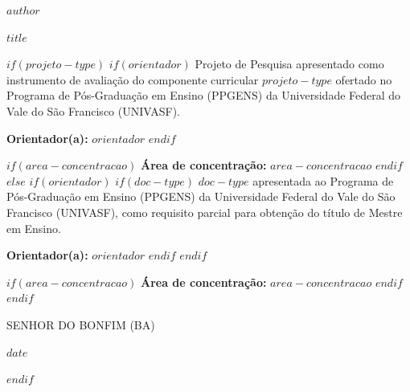 \begin{titlepage}
\thispagestyle{empty}
\begin{center}

{\Large\bfseries\MakeUppercase{$author$}}

\vspace{4cm}

{\Large\bfseries\MakeUppercase{$title$}}

\vspace{2cm}
\end{center}

\begin{flushright}
\begin{minipage}{0.5\textwidth}
$if(projeto-type)$
$if(orientador)$
Projeto de Pesquisa apresentado como instrumento de avaliação do componente curricular $projeto-type$ ofertado no Programa de Pós-Graduação em Ensino (PPGENS) da Universidade Federal do Vale do São Francisco (UNIVASF).

\vspace{1cm}

{\bfseries Orientador(a):} $orientador$
$endif$

\vspace{1cm}

$if(area-concentracao)$
{\bfseries Área de concentração:} $area-concentracao$
$endif$
$else$
$if(orientador)$
$if(doc-type)$
$doc-type$ apresentada ao Programa de Pós-Graduação em Ensino (PPGENS) da Universidade Federal do Vale do São Francisco (UNIVASF), como requisito parcial para obtenção do título de Mestre em Ensino.

\vspace{1cm}

{\bfseries Orientador(a):} $orientador$
$endif$
$endif$

\vspace{1cm}

$if(area-concentracao)$
{\bfseries Área de concentração:} $area-concentracao$
$endif$
$endif$
\end{minipage}
\end{flushright}

\vfill

\begin{center}
{\large\MakeUppercase{Senhor do Bonfim (BA)}}

\vspace{0.5cm}

{\large $date$}
\end{center}
\end{titlepage}
$endif$
